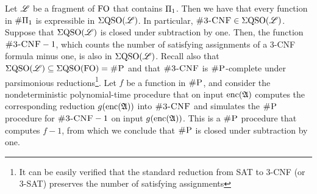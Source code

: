 Let $\mathscr{L}$ be a fragment of ${\rm FO}$ that contains $\Pi_{1}$. Then we have that every function in $\#\Pi_{1}$ is expressible in $\Sigma{\rm QSO}(\mathscr{L})$. In particular, $\ctcnf \in \eqso(\LL)$. Suppose that $\Sigma{\rm QSO}(\mathscr{L})$ is closed under subtraction by one. Then, the function $\ctcnf-1$, which counts the number of satisfying assignments of a 3-CNF formula minus one, is also in $\Sigma{\rm QSO}(\mathscr{L})$. Recall also that $\Sigma{\rm QSO}(\mathscr{L}) \subseteq \Sigma{\rm QSO}({\rm FO}) = \text{\sc \#P}$ and that $\ctcnf$ is $\text{\sc \#P}$-complete under parsimonious reductions\footnote{It can be easily verified that the standard reduction from SAT to 3-CNF (or 3-SAT) preserves the number of satisfying assignments}. Let $f$ be a function in $\text{\sc \#P}$, and consider the nondeterministic polynomial-time procedure that on input ${\rm enc}(\mathfrak{A})$ computes the corresponding reduction $g({\rm enc}(\mathfrak{A}))$ into $\ctcnf$ and simulates the $\text{\sc \#P}$ procedure for $\ctcnf-1$ on input $g({\rm enc}(\mathfrak{A}))$. This is a $\text{\sc \#P}$ procedure that computes $f-1$, from which we conclude that $\text{\sc \#P}$ is closed under subtraction by one.